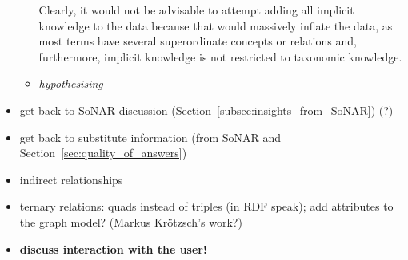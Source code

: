 \begin{itemize}
\begin{itemize}
        Clearly, it would not be advisable to attempt adding all implicit knowledge to the data
        because that would massively inflate the data,
        as most terms have several superordinate concepts or relations and,
        furthermore, implicit knowledge is not restricted to taxonomic knowledge.
      \item
        \emph{hypothesising}
    \end{itemize}
  \item
    get back to SoNAR discussion (Section~\ref{subsec:insights_from_SoNAR}) (?)
  \item
    get back to substitute information (from SoNAR and Section~\ref{sec:quality_of_answers})
  \item
    indirect relationships
  \item
    ternary relations: quads instead of triples (in \gls{RDF} speak); add attributes to the graph model? (Markus Krötzsch's work?)
  \item
    \textbf{discuss interaction with the user!}
\end{itemize}
